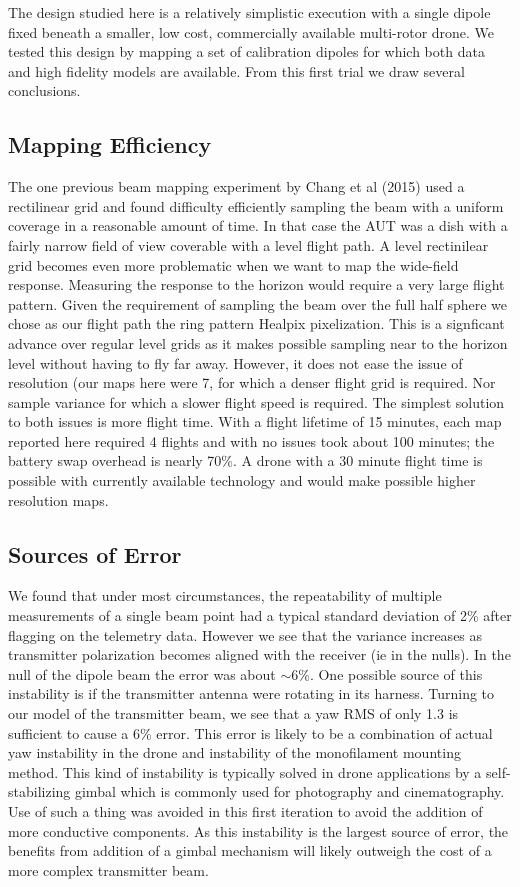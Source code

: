 \documentclass[preprint2,numberedappendix,tighten,twocolappendix]{aastex6}
\begin{document}
The design studied here is a relatively simplistic execution with a single dipole fixed beneath a smaller, low cost, commercially available multi-rotor drone.  We tested this design by mapping a set of calibration dipoles for which both data and high fidelity models are available.   From this first trial we draw several conclusions.

\subsection{Mapping Efficiency}
The one previous beam mapping experiment by Chang et al (2015) used a rectilinear grid and found difficulty efficiently sampling the beam with a uniform coverage in a reasonable amount of time.   In that case the AUT was a dish with a fairly narrow field of view coverable with a level flight path. A level rectinilear grid becomes even more problematic when we want to map the wide-field response.  Measuring the response to the horizon would require a very large flight pattern. Given the requirement of sampling the beam over the full half sphere we chose as our flight path the ring pattern Healpix pixelization. This is a signficant advance over regular level grids as it makes possible sampling near to the horizon level without having to fly far away. However, it does not ease the issue of resolution (our maps here were 7\arcdeg{}, for which a denser flight grid is required. Nor sample variance for which a slower flight speed is required. The simplest solution to both issues is more flight time. With a flight lifetime of 15 minutes, each map reported here required 4 flights and with no issues took about 100 minutes; the battery swap overhead is nearly 70\%.  A drone with a 30 minute flight time is possible with currently available technology and would make possible higher resolution maps.

\subsection{Sources of Error}
We found that under most circumstances, the repeatability of multiple measurements of a single beam point had a typical standard deviation of 2\% after flagging on the telemetry data. However we see that the variance increases as transmitter polarization becomes aligned with the receiver (ie in the nulls). In the null of the dipole beam the error was about $\sim$6\%. One possible source of this instability is if the transmitter antenna were rotating in its harness. Turning to our model of the transmitter beam, we see that a yaw RMS of only 1.3\arcdeg{} is sufficient to cause a 6\% error. This error is likely to be a combination of actual yaw instability in the drone and instability of the monofilament mounting method. This kind of instability is typically solved in drone applications by a self-stabilizing gimbal which is commonly used for photography and cinematography. Use of such a thing was avoided in this first iteration to avoid the addition of more conductive components. As this instability is the largest source of error, the benefits from addition of a gimbal  mechanism will likely outweigh the cost of a more complex transmitter beam. 
\end{document}
